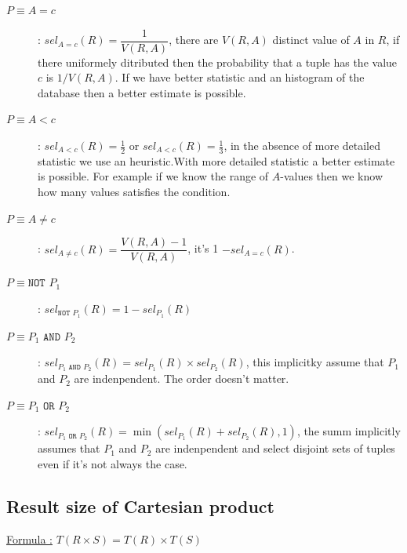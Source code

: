 \documentclass[12pt,a4paper]{article}
\begin{document}
\begin{description}
\item[$P \equiv A = c$] : $sel_{A=c} (R) = \dfrac{1}{V(R,A)}$, there are $V(R,A)$ distinct value of $A$ in $R$, if there uniformely ditributed then the probability that a tuple has the value $c$ is $1/V(R,A)$. If we have better statistic and an histogram of the database then a better estimate is possible.
\item[$P \equiv A<c$] : $sel_{A<c}(R) = \frac{1}{2}$ or $sel_{A<c}(R) = \frac{1}{3}$, in the absence of more detailed statistic we use an heuristic.With more detailed statistic a better estimate is possible. For example if we know the range of $A$-values then we know how many values satisfies the condition.
\item[$P \equiv A \neq c$] : $sel_{A \neq c}(R) = \dfrac{V(R,A) - 1}{V(R,A)}$, it's 1 $- sel_{A=c}(R)$.
\item[$P \equiv \texttt{NOT } P_1$] : $sel_{\texttt{NOT } P_1}(R) = 1 - sel_{P_1}(R)$
\item[$P \equiv P_1 \texttt{ AND } P_2$] : $sel_{P_1 \texttt{ AND } P_2}(R) = sel_{P_1}(R) \times sel_{P_2}(R)$, this implicitky assume that $P_1$ and $P_2$ are indenpendent. The order doesn't matter.
\item[$P \equiv P_1 \texttt{ OR } P_2$] : $sel_{P_1 \texttt{ OR } P_2}(R) = \min (sel_{P_1}(R) + sel_{P_2}(R),1)$, the summ implicitly assumes that $P_1$ and $P_2$ are indenpendent and select disjoint sets of tuples even if it's not always the case.
\end{description}

\subsection{Result size of Cartesian product}
\underline{Formula :} $T(R \times S) = T(R) \times T(S)$
\end{document}
